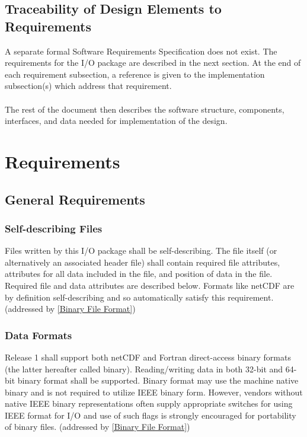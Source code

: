\documentclass[11pt]{article}
\begin{document}
\subsection{Traceability of Design Elements to Requirements}
A separate formal Software Requirements Specification does not exist.
The requirements for the I/O package are described in the next
section.  At the end of each requirement subsection, a reference
is given to the implementation subsection(s) which address that requirement.
\paragraph{}
The rest of the document then describes the software structure,
components, interfaces, and data needed for implementation of
the design.

\section{Requirements}

\subsection{General Requirements}

\subsubsection{Self-describing Files}
\label{Self-describing Files}
Files written by this I/O package shall be self-describing.
The file itself (or alternatively an associated header file)
shall contain required file attributes, attributes for all data
included in the file, and position of data in the file.
Required file and data attributes are described below.
Formats like netCDF are by definition self-describing
and so automatically satisfy this requirement.
(addressed by \ref{Binary File Format})

\subsubsection{Data Formats}
\label{Data Formats}
Release 1 shall support both netCDF and Fortran direct-access
binary formats (the latter hereafter called binary).
Reading/writing data in both 32-bit and 64-bit
binary format shall be supported.
Binary format may use the machine native binary and
is not required to utilize IEEE binary form.
However, vendors without native IEEE binary representations
often supply appropriate switches for using IEEE format
for I/O and use of such flags is strongly encouraged for
portability of binary files.
(addressed by \ref{Binary File Format})
\end{document}
